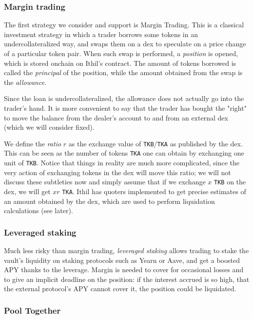 \documentclass[a4paper,10 pt]{article}
\theoremstyle{definition}
\begin{document}
\subsubsection{Margin trading}

The first strategy we consider and support is Margin Trading. This is a classical investment strategy in which a trader borrows some tokens in an undercollateralized way, and swaps them on a dex to speculate on a price change of a particular token pair. When such swap is performed, a {\it position} is opened, which is stored onchain on Ithil's contract. The amount of tokens borrowed is called the {\it principal} of the position, while the amount obtained from the swap is the {\it allowance}.

Since the loan is undercollateralized, the allowance does not actually go into the trader's hand. It is more convenient to say that the trader has bought the "right" to move the balance from the dealer's account to and from an external dex (which we will consider fixed).

We define the {\it ratio} $r$ as the exchange value of \verb|TKB|/\verb|TKA| as published by the dex. This can be seen as the number of tokens \verb|TKA| one can obtain by exchanging one unit of \verb|TKB|. Notice that things in reality are much more complicated, since the very action of exchanging tokens in the dex will move this ratio; we will not discuss these subtleties now and simply assume that if we exchange $x$ \verb|TKB| on the dex, we will get $xr$ \verb|TKA|. Ithil has quoters implemented to get precise estimates of an amount obtained by the dex, which are used to perform liquidation calculations (see later).

\subsubsection{Leveraged staking}

Much less risky than margin trading, {\it leveraged staking} allows trading to stake the vault's liquidity on staking protocols such as Yearn or Aave, and get a boosted APY thanks to the leverage. Margin is needed to cover for occasional losses and to give an implicit deadline on the position: if the interest accrued is so high, that the external protocol's APY cannot cover it, the position could be liquidated.

\subsubsection{Pool Together}
\end{document}
